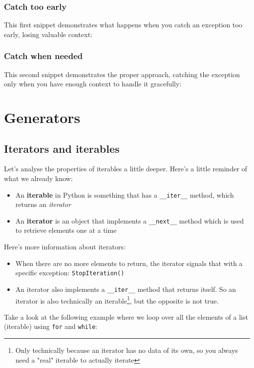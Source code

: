 

\hrulefill

\subsubsection{Catch too early}
This first snippet demonstrates what happens when you catch an exception too early, losing valuable context:


\hrulefill

\subsubsection{Catch when needed}
This second snippet demonstrates the proper approach, catching the exception only when you have enough context to handle it gracefully:


\newpage 
\section{Generators}

\subsection{Iterators and iterables}
Let's analyse the properties of iterables a little deeper. Here's a little reminder of what we already know:
\begin{itemize}
    \item[-] An \textbf{iterable} in Python is something that has a \texttt{\_\_iter\_\_} method, which returns an \textit{iterator}
    \item[-] An \textbf{iterator} is an object that implements a \texttt{\_\_next\_\_} method which is used to retrieve elements one at a time
\end{itemize}
Here's more information about iterators:
\begin{itemize}
    \item[-] When there are no more elements to return, the iterator signals that with a specific exception: \texttt{StopIteration()}
    \item[-] An iterator also implements a \texttt{\_\_iter\_\_} method that returns itself. So an iterator is also technically an iterable\footnote{Only technically because an iterator has no data of its own, so you always need a "real" iterable to actually iterate}, but the opposite is not true.
\end{itemize}
Take a look at the following example where we loop over all the elements of a list (iterable) using \texttt{for} and \texttt{while}:

